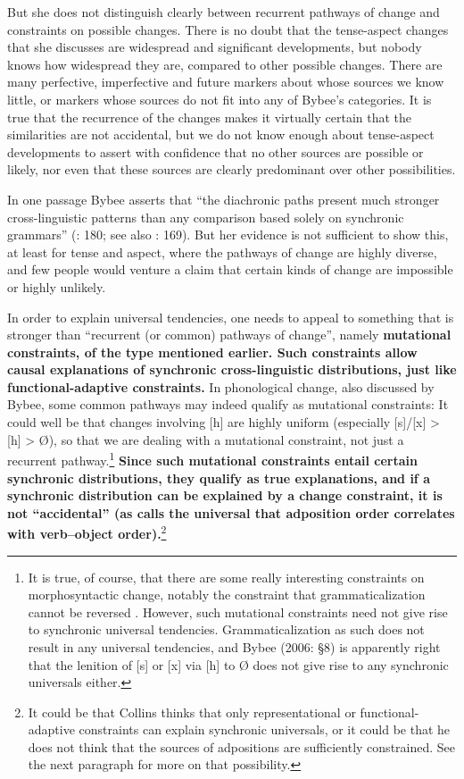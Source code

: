 \documentclass[output=paper]{langsci/langscibook}
\begin{document}
 
But she does not distinguish clearly between recurrent pathways of change and constraints on possible changes. There is no doubt that the tense-aspect changes that she discusses are widespread and significant developments, but nobody knows how widespread they are, compared to other possible changes. There are many perfective, imperfective and future markers about whose sources we know little, or markers whose sources do not fit into any of Bybee’s categories. It is true that the recurrence of the changes makes it virtually certain that the similarities are not accidental, but we do not know enough about tense-aspect developments to assert with confidence that no other sources are possible or likely, nor even that these sources are clearly predominant over other possibilities. 
 
In one passage Bybee asserts that “the diachronic paths present much stronger cross-linguistic patterns than any comparison based solely on synchronic grammars” (\citeyear{Bybee2006}: 180; see also \citealt{Bybee2008}: 169). But her evidence is not sufficient to show this, at least for tense and aspect, where the pathways of change are highly diverse, and few people would venture a claim that certain kinds of change are impossible or highly unlikely. 
 
In order to explain universal tendencies, one needs to appeal to something that is stronger than “recurrent (or common) pathways of change”, namely \textbf{{mutational constraints, of the type mentioned earlier. Such constraints allow causal explanations of synchronic cross-linguistic distributions, just like functional-adaptive constraints.} }In phonological change, also discussed by Bybee, some common pathways may indeed qualify as mutational constraints: It could well be that changes involving [h] are highly uniform (especially [s]/[x] > [h] > Ø), so that we are dealing with a mutational constraint, not just a recurrent pathway.\footnote{It is true, of course, that there are some really interesting constraints on morphosyntactic change, notably the constraint that grammaticalization cannot be reversed \citep{Haspelmath1999b}. However, such mutational constraints need not give rise to synchronic universal tendencies. Grammaticalization as such does not result in any universal tendencies, and Bybee (2006: §8) is apparently right that the lenition of [s] or [x] via [h] to Ø does not give rise to any synchronic universals either.}\textbf{{ Since such mutational constraints entail certain synchronic distributions, they qualify as true explanations, and if a synchronic distribution can be explained by a change constraint, it is not “accidental” (as  calls the universal that adposition order correlates with verb–object order).}}\footnote{It could be that Collins thinks that only representational or functional-adaptive constraints can explain synchronic universals, or it could be that he does not think that the sources of adpositions are sufficiently constrained. See the next paragraph for more on that possibility.}
 
\end{document}
